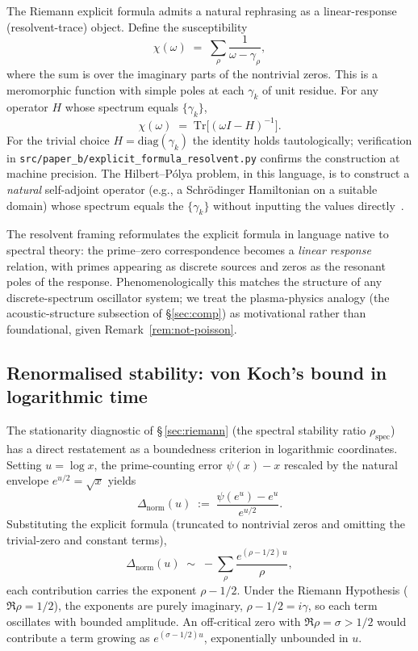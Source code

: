 \documentclass[11pt,a4paper]{article}
\theoremstyle{plain}
\theoremstyle{definition}
\theoremstyle{remark}
\begin{document}
The Riemann explicit formula admits a natural rephrasing as a
linear-response (resolvent-trace) object.  Define the susceptibility
\begin{equation}\label{eq:chi-omega}
  \chi(\omega) \;=\; \sum_{\rho} \frac{1}{\omega - \gamma_\rho},
\end{equation}
where the sum is over the imaginary parts of the nontrivial zeros.
This is a meromorphic function with simple poles at each $\gamma_k$
of unit residue.  For any operator $H$ whose spectrum equals
$\{\gamma_k\}$,
\begin{equation}\label{eq:trace-resolvent}
  \chi(\omega) \;=\; \mathrm{Tr}\bigl[(\omega I - H)^{-1}\bigr].
\end{equation}
For the trivial choice $H = \mathrm{diag}(\gamma_k)$ the identity
holds tautologically; verification in
\texttt{src/paper\_b/explicit\_formula\_resolvent.py} confirms
the construction at machine precision.  The Hilbert--P\'{o}lya
problem, in this language, is to construct a \emph{natural}
self-adjoint operator (e.g., a Schr\"{o}dinger Hamiltonian on a
suitable domain) whose spectrum equals the $\{\gamma_k\}$ without
inputting the values directly~\cite{BerryKeating1999, Connes1999}.

The resolvent framing reformulates the explicit formula in
language native to spectral theory: the prime--zero
correspondence becomes a \emph{linear response} relation, with primes
appearing as discrete sources and zeros as the resonant poles of the
response.  Phenomenologically this matches the structure of any
discrete-spectrum oscillator system; we treat the plasma-physics
analogy (the acoustic-structure subsection of \S\ref{sec:comp}) as
motivational rather than foundational, given Remark~\ref{rem:not-poisson}.

\subsection{Renormalised stability: von Koch's bound in logarithmic time}
\label{sec:vonKoch}

The stationarity diagnostic of \S\,\ref{sec:riemann} (the spectral
stability ratio $\rho_{\mathrm{spec}}$) has a direct restatement as
a boundedness criterion in logarithmic coordinates.  Setting $u = \log x$, the prime-counting error
$\psi(x) - x$ rescaled by the natural envelope $e^{u/2} = \sqrt{x}$
yields
\begin{equation}\label{eq:Delta-norm}
  \Delta_{\mathrm{norm}}(u) \;:=\; \frac{\psi(e^u) - e^u}{e^{u/2}}.
\end{equation}
Substituting the explicit formula (truncated to nontrivial zeros and
omitting the trivial-zero and constant terms),
\begin{equation}
  \Delta_{\mathrm{norm}}(u) \;\sim\; -\sum_{\rho} \frac{e^{(\rho - 1/2)\,u}}{\rho},
\end{equation}
each contribution carries the exponent $\rho - 1/2$.  Under the
Riemann Hypothesis ($\Re\rho = 1/2$), the exponents are purely
imaginary, $\rho - 1/2 = i\gamma$, so each term oscillates with
bounded amplitude.  An off-critical zero with $\Re\rho = \sigma > 1/2$
would contribute a term growing as $e^{(\sigma - 1/2)u}$, exponentially
unbounded in $u$.
\end{document}
